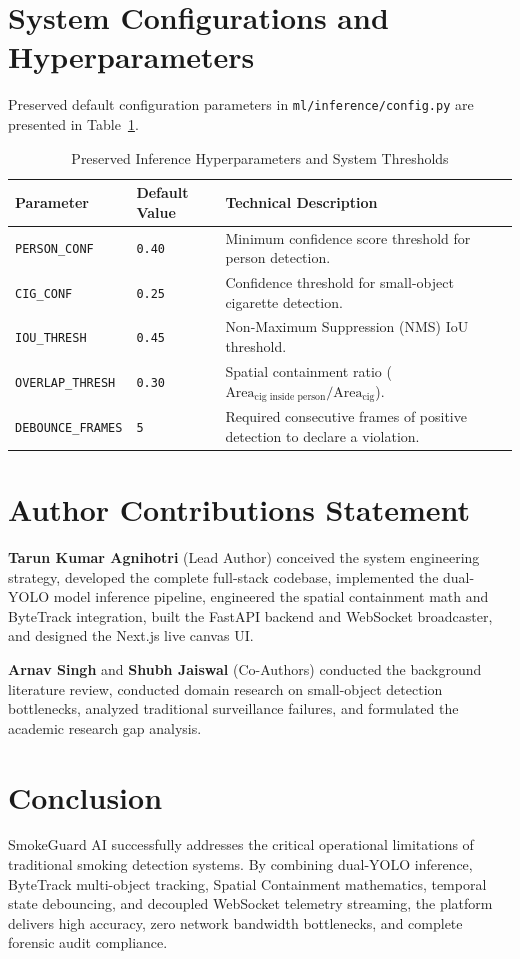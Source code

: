 \documentclass[11pt,a4paper]{article}
\begin{document}
\section{System Configurations and Hyperparameters}

Preserved default configuration parameters in \texttt{ml/inference/config.py} are presented in Table~\ref{tab:config_params}.

\begin{table}[H]
\centering
\caption{Preserved Inference Hyperparameters and System Thresholds}
\label{tab:config_params}
\small
\vspace{0.4em}
\begin{tabular}{llp{8cm}}
\toprule
\textbf{Parameter} & \textbf{Default Value} & \textbf{Technical Description} \\
\midrule
\texttt{PERSON\_CONF} & \texttt{0.40} & Minimum confidence score threshold for person detection. \\
\texttt{CIG\_CONF} & \texttt{0.25} & Confidence threshold for small-object cigarette detection. \\
\texttt{IOU\_THRESH} & \texttt{0.45} & Non-Maximum Suppression (NMS) IoU threshold. \\
\texttt{OVERLAP\_THRESH} & \texttt{0.30} & Spatial containment ratio ($\text{Area}_{\text{cig inside person}} / \text{Area}_{\text{cig}}$). \\
\texttt{DEBOUNCE\_FRAMES} & \texttt{5} & Required consecutive frames of positive detection to declare a violation. \\
\bottomrule
\end{tabular}
\end{table}

\section{Author Contributions Statement}

\textbf{Tarun Kumar Agnihotri} (Lead Author) conceived the system engineering strategy, developed the complete full-stack codebase, implemented the dual-YOLO model inference pipeline, engineered the spatial containment math and ByteTrack integration, built the FastAPI backend and WebSocket broadcaster, and designed the Next.js live canvas UI. 

\textbf{Arnav Singh} and \textbf{Shubh Jaiswal} (Co-Authors) conducted the background literature review, conducted domain research on small-object detection bottlenecks, analyzed traditional surveillance failures, and formulated the academic research gap analysis.

\section{Conclusion}

SmokeGuard AI successfully addresses the critical operational limitations of traditional smoking detection systems. By combining dual-YOLO inference, ByteTrack multi-object tracking, Spatial Containment mathematics, temporal state debouncing, and decoupled WebSocket telemetry streaming, the platform delivers high accuracy, zero network bandwidth bottlenecks, and complete forensic audit compliance.
\end{document}
